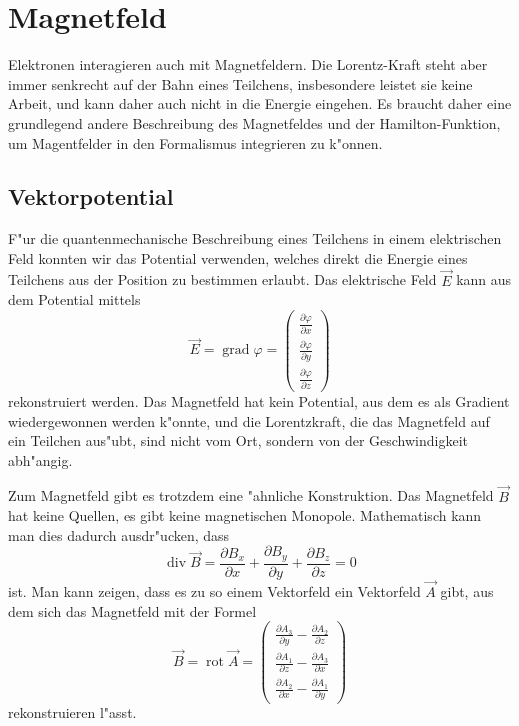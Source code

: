 \chapter{Magnetfeld\label{chapter:magnetfeld}}
\rhead{}
Elektronen interagieren auch mit Magnetfeldern. Die Lorentz-Kraft
steht aber immer senkrecht auf der Bahn eines Teilchens, insbesondere
leistet sie keine Arbeit, und kann daher auch nicht in die Energie
eingehen.
Es braucht daher eine grundlegend andere Beschreibung des Magnetfeldes
und der Hamilton-Funktion, um Magentfelder in den Formalismus
integrieren zu k"onnen.

\section{Vektorpotential\label{section:vektorpotential}}
F"ur die quantenmechanische Beschreibung eines Teilchens in einem
elektrischen Feld konnten wir das Potential verwenden, welches
direkt die Energie eines Teilchens aus der Position zu bestimmen
erlaubt. 
Das elektrische Feld $\vec E$ kann aus dem Potential mittels
\[
\vec E=\operatorname{grad}\varphi
=
\begin{pmatrix}
\frac{\partial\varphi}{\partial x}\\
\frac{\partial\varphi}{\partial y}\\
\frac{\partial\varphi}{\partial z}
\end{pmatrix}
\]
rekonstruiert werden.
Das Magnetfeld hat kein Potential, aus dem es als Gradient wiedergewonnen
werden k"onnte, und die Lorentzkraft, die das Magnetfeld
auf ein Teilchen aus"ubt, sind nicht vom Ort, sondern von der Geschwindigkeit
abh"angig.

Zum Magnetfeld gibt es trotzdem eine "ahnliche Konstruktion.
Das Magnetfeld $\vec B$ hat keine Quellen, es gibt keine magnetischen
Monopole.
Mathematisch kann man dies dadurch ausdr"ucken, dass 
\[
\operatorname{div}\vec B
=
\frac{\partial B_x}{\partial x}
+
\frac{\partial B_y}{\partial y}
+
\frac{\partial B_z}{\partial z}
=0
\]
ist.
Man kann zeigen, dass es zu so einem Vektorfeld ein Vektorfeld $\vec A$
gibt, aus dem sich das Magnetfeld mit der Formel
\[
\vec B=\operatorname{rot}\vec A
=\begin{pmatrix}
\frac{\partial A_3}{\partial y}-\frac{\partial A_2}{\partial z}\\
\frac{\partial A_1}{\partial z}-\frac{\partial A_3}{\partial x}\\
\frac{\partial A_2}{\partial x}-\frac{\partial A_1}{\partial y}
\end{pmatrix}
\]
rekonstruieren l"asst.

